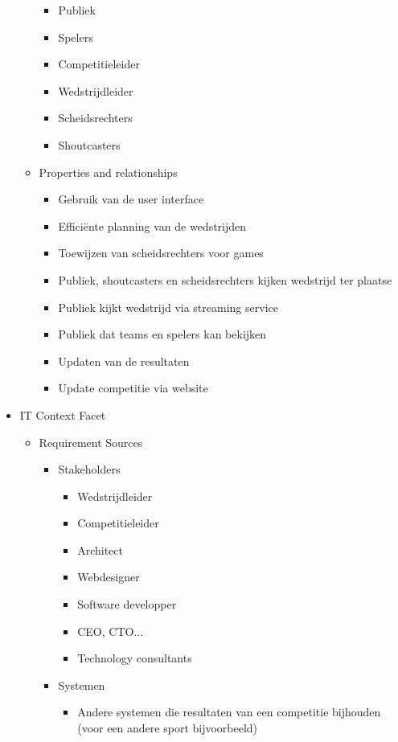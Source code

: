 \documentclass[12pt,a4paper]{article}
\begin{document}
\begin{itemize}
\begin{itemize}
\begin{itemize}
					\item Publiek
					\item Spelers
					\item Competitieleider
					\item Wedstrijdleider
					\item Scheidsrechters
					\item Shoutcasters
				\end{itemize}
				\item Properties and relationships
				\begin{itemize}
					\item Gebruik van de user interface
					\item Efficiënte planning van de wedstrijden
					\item Toewijzen van scheidsrechters voor games
					\item Publiek, shoutcasters en scheidsrechters kijken wedstrijd ter plaatse
					\item Publiek kijkt wedstrijd via streaming service
					\item Publiek dat teams en spelers kan bekijken
					\item Updaten van de resultaten
					\item Update competitie via website
				\end{itemize}
			\end{itemize}
			\item IT Context Facet
			\begin{itemize}
				\item Requirement Sources
				\begin{itemize}
					\item Stakeholders
					\begin{itemize}
						\item Wedstrijdleider
						\item Competitieleider
						\item Architect
						\item Webdesigner
						\item Software developper
						\item CEO, CTO...
						\item Technology consultants
					\end{itemize}
					\item Systemen
					\begin{itemize}
						\item Andere systemen die resultaten van een competitie bijhouden (voor een andere sport bijvoorbeeld)

\end{itemize}
\end{itemize}
\end{itemize}
\end{itemize}
\end{document}
